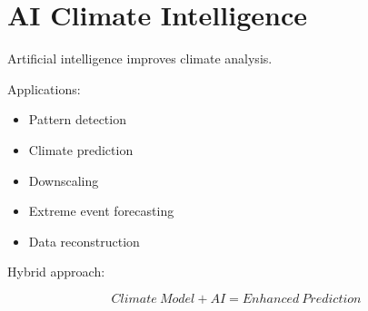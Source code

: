 \section{AI Climate Intelligence}


Artificial intelligence improves climate analysis.



Applications:


\begin{itemize}

\item Pattern detection

\item Climate prediction

\item Downscaling

\item Extreme event forecasting

\item Data reconstruction

\end{itemize}



Hybrid approach:


\[
Climate\ Model + AI
=
Enhanced\ Prediction
\]

